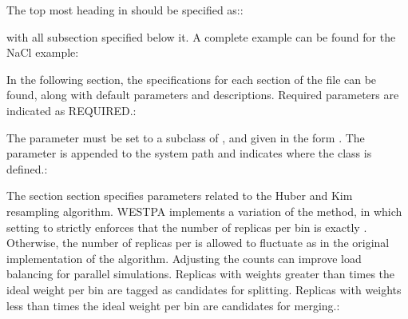 \documentclass[letterpaper,10pt,english]{sphinxmanual}
\begin{document}
The top most heading in  should be specified as::

\begin{sphinxVerbatim}[commandchars=\\\{\}]
\end{sphinxVerbatim}

with all sub\sphinxhyphen{}section specified below it. A complete example can be found for
the NaCl example:

In the following section, the specifications for each section of the file can
be found, along with default parameters and descriptions. Required parameters
are indicated as REQUIRED.:

\begin{sphinxVerbatim}[commandchars=\\\{\}]
         
         \PYG{p}{[}\PYG{p}{]}
\end{sphinxVerbatim}

The  parameter must be set to a subclass of , and given
in the form . The  parameter is appended to the
system path and indicates where the class is defined.:

\begin{sphinxVerbatim}[commandchars=\\\{\}]
         
         
         
\end{sphinxVerbatim}

The  section section specifies parameters related to the Huber and Kim
resampling algorithm. WESTPA implements a variation of the method, in which
setting  to  strictly enforces that the number of
replicas per bin is exactly . Otherwise, the number
of replicas per is allowed to fluctuate as in the original implementation of
the algorithm. Adjusting the counts can improve load balancing for parallel
simulations. Replicas with weights greater than 
times the ideal weight per bin are tagged as candidates for splitting. Replicas
with weights less than  times the ideal weight per bin
are candidates for merging.:
\end{document}
